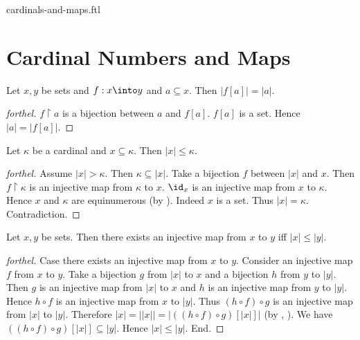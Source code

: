 \documentclass{naproche-library}
\begin{document}
\begin{smodule}{cardinals-and-maps.ftl}
  
  \begin{forthel}
  \end{forthel}

  \section*{Cardinal Numbers and Maps}  

  \begin{proposition}[forthel,id=SET_THEORY_06_5513850721927168,printid]
    Let $x, y$ be sets and $f : x \into y$ and $a \subseteq x$.
    Then $|f[a]| = |a|$.
  \end{proposition}
  \begin{proof}[forthel]
    $f \restriction a$ is a bijection between $a$ and $f[a]$.
    $f[a]$ is a set.
    Hence $|a| = |f[a]|$.
  \end{proof}

  \begin{proposition}[forthel,id=SET_THEORY_06_6702394681735923,printid]
    Let $\kappa$ be a cardinal and $x \subseteq \kappa$.
    Then $|x| \leq \kappa$.
  \end{proposition}
  \begin{proof}[forthel]
    Assume $|x| > \kappa$.
    Then $\kappa \subseteq |x|$.
    Take a bijection $f$ between $|x|$ and $x$.
    Then $f \restriction \kappa$ is an injective map from $\kappa$ to $x$.
    $\id_{x}$ is an injective map from $x$ to $\kappa$.
    Hence $x$ and $\kappa$ are equinumerous (by ).
    Indeed $x$ is a set.
    Thus $|x| = \kappa$.
    Contradiction.
  \end{proof}

  \begin{proposition}[forthel,id=SET_THEORY_06_407116133171200,printid]
    Let $x, y$ be sets.
    Then there exists an injective map from $x$ to $y$ iff $|x| \leq |y|$.
  \end{proposition}
  \begin{proof}[forthel]
    Case there exists an injective map from $x$ to $y$.
      Consider an injective map $f$ from $x$ to $y$.
      Take a bijection $g$ from $|x|$ to $x$ and a bijection $h$ from $y$ to $|y|$.
      Then $g$ is an injective map from $|x|$ to $x$ and $h$ is an injective map from $y$ to $|y|$.
      Hence $h \circ f$ is an injective map from $x$ to $|y|$.
      Thus $(h \circ f) \circ g$ is an injective map from $|x|$ to $|y|$.
      Therefore $|x|
        = ||x||
        = |((h \circ f) \circ g)[|x|]|$
      (by , ).
      We have $((h \circ f) \circ g)[|x|] \subseteq |y|$.
      Hence $|x| \leq |y|$.
    End.


\end{proof}
\end{smodule}
\end{document}
